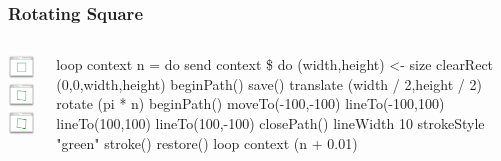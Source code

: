 \documentclass{beamer}
\begin{document}
\begin{frame}[fragile]
\frametitle{Rotating Square}

\begin{columns}
\begin{column}{0.40\textwidth}
\includegraphics[trim = 25mm 30mm 25mm 25mm, clip, width=90pt]{1.png}\\
\includegraphics[trim = 25mm 30mm 25mm 25mm, clip, width=90pt]{3.png}\\
\includegraphics[trim = 25mm 30mm 25mm 25mm, clip, width=90pt]{5.png}
\end{column}
\begin{column}{0.60\textwidth}
\begin{codeblock}[0.95]
\footnotesize
\begin{semiverbatim}
loop context n = do
    send context \$ do
        (width,height) <- size
        clearRect (0,0,width,height)
        beginPath()
        save()
        translate (width / 2,height / 2)
        rotate (pi * n)
        beginPath()
        moveTo(-100,-100)
        lineTo(-100,100)
        lineTo(100,100)
        lineTo(100,-100)
        closePath()
        lineWidth 10
        strokeStyle "green"
        stroke()
        restore()
    loop context (n + 0.01)
\end{semiverbatim}
\end{codeblock}
\end{column}
\end{columns}


\end{frame}
\end{document}
